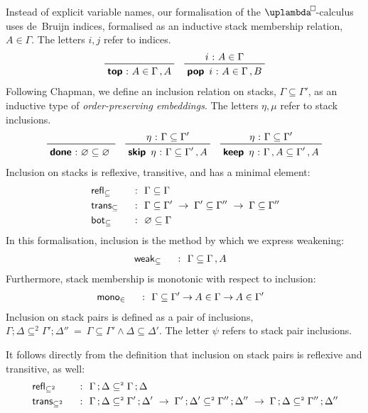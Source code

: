 \documentclass[submission,copyright,creativecommons,sharealike,backref=page]{eptcs}
\newcommand{\uplambdabox}{\uplambda^{\mkern-3mu\Box\mkern-3mu}}
\renewcommand{\leq}{\mathrel{\subseteq}}
\newcommand{\leqII}{\mathrel{\subseteq^{\scriptscriptstyle{2}}}}
\renewcommand{\:}{\mathop{\mkern3mu:\mkern3mu}}
\renewcommand{\.}{\mathop{\mkern3mu.\mkern3mu}}
\renewcommand{\;}{\mathop{;}}
\renewcommand{\,}{\mathop{,}}
\newcommand{\conj}{\mathrel{\wedge}}
\renewcommand{\r}{\mathrel{\rightarrow\mkern-1mu}}
\newcommand{\monoin}{\operatorname{\textsf{mono}_{\in}}}
\newcommand{\botleq}{\operatorname{\textsf{bot}_{\leq}}}
\newcommand{\weakleq}{\operatorname{\textsf{weak}_{\leq}}}
\newcommand{\reflleq}{\operatorname{\textsf{refl}_{\leq}}}
\newcommand{\reflleqII}{\operatorname{\textsf{refl}_{\leqII}}}
\newcommand{\transleq}{\operatorname{\textsf{trans}_{\leq}}}
\newcommand{\transleqII}{\operatorname{\textsf{trans}_{\leqII}}}
\renewcommand{\O}{\varnothing}
\newcommand{\donel}{\operatorname{\textsf{\textbf{done}}}}
\newcommand{\keepl}{\operatorname{\textsf{\textbf{keep}}}}
\newcommand{\skipl}{\operatorname{\textsf{\textbf{skip}}}}
\newcommand{\tops}{\operatorname{\textsf{\textbf{top}}}}
\newcommand{\pops}{\operatorname{\textsf{\textbf{pop}}}}
\theoremstyle{mystyle}
\begin{document}
Instead of explicit variable names, our formalisation of the $\uplambdabox$-calculus uses de~Bruijn indices, formalised as an inductive stack membership relation, $A \in \Gamma$.  The letters $i, j$ refer to indices.
\begin{align*}
  \prftree
    {}
    {\tops \: A \in \Gamma \, A}
  \quad
  \prftree
    {i \: A \in \Gamma}
    {\pops~i \: A \in \Gamma \, B}
\end{align*}
Following Chapman\cite{Chapman09}, we define an inclusion relation on stacks, $\Gamma \leq \Gamma'$, as an inductive type of \emph{order-preserving embeddings}.  The letters $\eta, \mu$ refer to stack inclusions.
\begin{align*}
  \prftree
    {}
    {\donel \: \O \leq \O \phantom{'}}
  \quad
  \prftree
    {\eta \: \Gamma \leq \Gamma'}
    {\skipl~\eta \: \Gamma \leq \Gamma' \, A}
  \quad
  \prftree
    {\eta \: \Gamma \leq \Gamma'}
    {\keepl~\eta \: \Gamma \, A \leq \Gamma' \, A}
\end{align*}
Inclusion on stacks is reflexive, transitive, and has a minimal element:
\begin{alignat*}{2}
  & \reflleq    && ~\:~ \Gamma \leq \Gamma\\
  & \transleq   && ~\:~ \Gamma \leq \Gamma' ~\r~ \Gamma' \leq \Gamma'' ~\r~ \Gamma \leq \Gamma''\\
  & \botleq     && ~\:~ \O \leq \Gamma
\end{alignat*}
In this formalisation, inclusion is the method by which we express weakening:
\begin{alignat*}{2}
  & \weakleq    && ~\:~ \Gamma \leq \Gamma \, A
\end{alignat*}
Furthermore, stack membership is monotonic with respect to inclusion:
\begin{alignat*}{2}
  & \monoin     && ~\:~ \Gamma \leq \Gamma' \r A \in \Gamma \r A \in \Gamma'
\end{alignat*}
Inclusion on stack pairs is defined as a pair of inclusions, $\Gamma \; \Delta \leqII \Gamma' \; \Delta'' ~=~ \Gamma \leq \Gamma' \conj \Delta \leq \Delta'$.  The letter $\psi$ refers to stack pair inclusions.

It follows directly from the definition that inclusion on stack pairs is reflexive and transitive, as well:
\begin{alignat*}{2}
  & \reflleqII  && ~\:~ \Gamma \; \Delta \leqII \Gamma \; \Delta\\
  & \transleqII && ~\:~ \Gamma \; \Delta \leqII \Gamma' \; \Delta' ~\r~ \Gamma' \; \Delta' \leqII \Gamma'' \; \Delta'' ~\r~ \Gamma \; \Delta \leqII \Gamma'' \; \Delta''
\end{alignat*}
\end{document}
